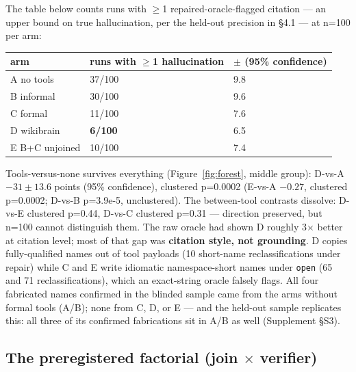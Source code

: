 \documentclass[10pt]{article}
\newcommand{\code}[1]{\texttt{#1}}
\newcommand{\best}[1]{\textbf{#1}}
\newcommand{\Ssec}[1]{Supplement \S #1}
\begin{document}
The table below counts runs with $\geq$1 repaired-oracle-flagged
citation --- an upper bound on true hallucination, per the held-out
precision in \S 4.1 --- at n=100 per arm:

\begin{center}\footnotesize
\begin{tabular}{@{}lll@{}}
\toprule
arm & runs with $\geq$1 hallucination & $\pm$ (95\% confidence) \\
\midrule
A no tools & 37/100 & 9.8 \\
B informal & 30/100 & 9.6 \\
C formal & 11/100 & 7.6 \\
D wikibrain & \best{6/100} & 6.5 \\
E B+C unjoined & 10/100 & 7.4 \\
\bottomrule
\end{tabular}
\end{center}

Tools-versus-none survives everything (Figure~\ref{fig:forest}, middle
group): D-vs-A $-31 \pm 13.6$
points (95\% confidence), clustered p=0.0002 (E-vs-A $-0.27$, clustered
p=0.0002; D-vs-B p=3.9e-5, unclustered). The between-tool contrasts
dissolve: D-vs-E clustered p=0.44, D-vs-C clustered p=0.31 ---
direction preserved, but n=100 cannot distinguish them. The raw oracle
had shown D roughly 3$\times$ better at citation level; most of that gap
was \textbf{citation style, not grounding}. D copies fully-qualified
names out of tool payloads (10 short-name reclassifications under
repair) while C and E write idiomatic namespace-short names under
\code{open} (65 and 71 reclassifications), which an exact-string oracle
falsely flags. All four fabricated names confirmed in the blinded sample
came from the arms without formal tools (A/B); none from C, D, or E ---
and the held-out sample replicates this: all three of its confirmed
fabrications sit in A/B as well (\Ssec{S3}).

\subsection{The preregistered factorial (join $\times$ verifier)}
\label{sec:factorial}
\end{document}
